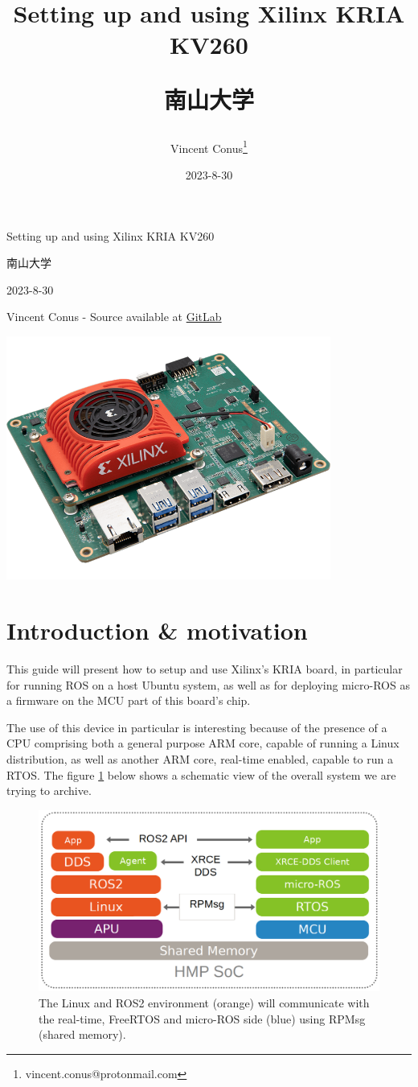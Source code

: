 \documentclass[10pt]{article}
\author{Vincent Conus\thanks{vincent.conus@protonmail.com}}
\date{2023-8-30}
\title{Setting up and using Xilinx KRIA KV260\\\medskip
\large \begin{CJK}{UTF8}{min}南山大学\end{CJK}}
\newcommand{\gitlab}[1]{%
\href{#1}{GitLab \faGitlab}}
\begin{document}
\begin{titlepage}
\centering
{\LARGE Setting up and using Xilinx KRIA KV260 \par }
\vspace{5mm}
{\large \begin{CJK}{UTF8}{min}南山大学\end{CJK} \par}
\vspace{1cm}
{\large 2023-8-30 \par}
\vspace{2cm}
{\large Vincent Conus -  Source available at \gitlab{https://gitlab.com/sunoc/xilinx-kria-kv260-documentation} \par}
\vspace{3cm}
\includegraphics[width=0.8\textwidth]{./img/board}\end{titlepage}
\tableofcontents
\pagebreak
\section{Introduction \& motivation}
\label{sec:org84f5197}
This guide will present how to setup and use Xilinx's KRIA board, in particular
for running ROS on a host Ubuntu system, as well as for deploying micro-ROS as a
firmware on the MCU part of this board's chip.

The use of this device in particular is interesting because of the presence of a
CPU comprising both a general purpose ARM core, capable of running a Linux
distribution, as well as another ARM core, real-time enabled, capable to run a
RTOS. The figure \ref{fig:orge0b4beb} below shows a schematic view of the overall system we
are trying to archive.

\begin{figure}[htbp]
\centering
\includegraphics[width=.6\textwidth]{./img/map.png}
\caption{\label{fig:orge0b4beb}The Linux and ROS2 environment (orange) will communicate with the real-time, FreeRTOS and micro-ROS side (blue) using RPMsg (shared memory).}
\end{figure}
\end{document}
